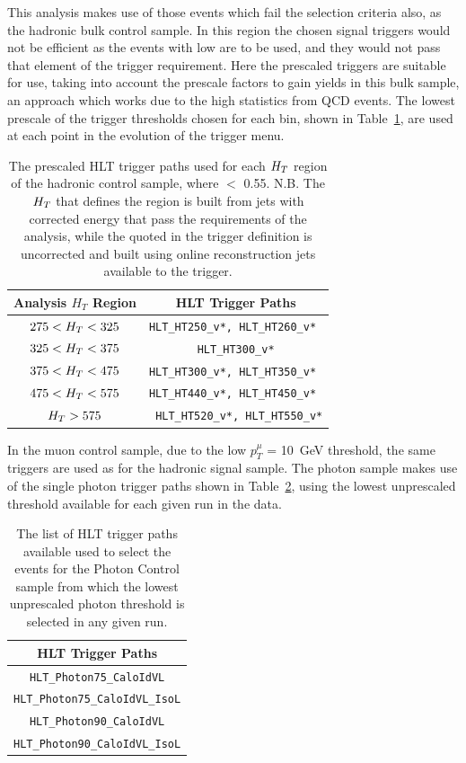 This analysis makes use of those events which fail the \alt selection criteria also, as the hadronic bulk control sample. In this region the chosen signal triggers would not be efficient as the events with low \MHT are to be used, and they would not pass that element of the trigger requirement. Here the prescaled \HT triggers are suitable for use, taking into account the prescale factors to gain yields in this bulk sample, an approach which works due to the high statistics from QCD events. The lowest prescale of the trigger thresholds chosen for each \HT bin, shown in Table~\ref{tab:bulktrig}, are used at each point in the evolution of the trigger menu.


\begin{table}[htbp]
\centering
\begin{tabular}{ c c }
\hline
\hline
Analysis $H_{T}$ Region & HLT Trigger Paths\\
\hline
\hline
$275 < H_{T} < 325$ & \verb!HLT_HT250_v*, HLT_HT260_v* !\\
$325 < H_{T} < 375$ & \verb!HLT_HT300_v*!\\
$375 < H_{T} < 475$ & \verb!HLT_HT300_v*, HLT_HT350_v* !\\
$475 < H_{T} < 575$ &\verb!HLT_HT440_v*, HLT_HT450_v* !\\
$H_{T} > 575$ & \verb! HLT_HT520_v*, HLT_HT550_v*!\\
\hline
\end{tabular}
\caption{\label{tab:bulktrig}The prescaled HLT trigger paths used for each $H_{T}$ region of the hadronic control sample, where \alt $<$ 0.55. N.B. The $H_{T}$ that defines the region is built from jets with corrected energy that pass the requirements of the analysis, while the \HT quoted in the trigger definition is uncorrected and built using online reconstruction jets available to the trigger.}
\end{table}



In the muon control sample, due to the low $p^{\mu}_{T}$ = 10~GeV threshold, the same triggers are used as for the hadronic signal sample. The photon sample makes use of the single photon trigger paths shown in Table~\ref{tab:photrig}, using the lowest unprescaled threshold available for each given run in the data.
\begin{table}[htbp]
\centering
\begin{tabular}{ c }
\hline
\hline
HLT Trigger Paths\\
\hline
\hline
\verb!HLT_Photon75_CaloIdVL!\\
\verb!HLT_Photon75_CaloIdVL_IsoL!\\
\verb!HLT_Photon90_CaloIdVL!\\
\verb!HLT_Photon90_CaloIdVL_IsoL!\\
\hline
\end{tabular}
\caption{\label{tab:photrig}The list of HLT trigger paths available used to select the events for the Photon Control sample from which the lowest unprescaled photon threshold is selected in any given run.}
\end{table}


